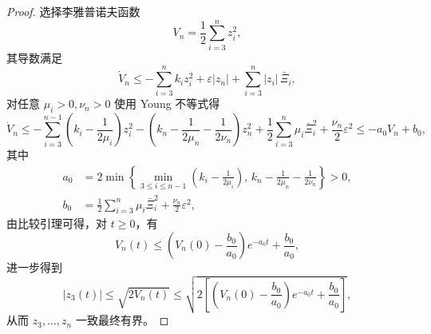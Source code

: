 \begin{proof}
选择李雅普诺夫函数
\begin{equation}\label{eq:ch3_vn_mid}
V_n=\frac{1}{2}\sum_{i=3}^{n}z_i^2,
\end{equation}
其导数满足
\begin{equation}\label{eq:ch3_vdot_mid}
\dot V_n
\le -\sum_{i=3}^{n}k_i z_i^2+\varepsilon|z_n|+\sum_{i=3}^{n}|z_i|\,\bar\Xi_i,
\end{equation}
对任意 $\mu_i>0,\nu_n>0$ 使用 Young 不等式得
\begin{equation}\label{eq:ch3_vdot_mid2}
\dot V_n
\le -\sum_{i=3}^{n-1}\left(k_i-\frac{1}{2\mu_i}\right)z_i^2
 -\left(k_n-\frac{1}{2\mu_n}-\frac{1}{2\nu_n}\right)z_n^2
 +\frac{1}{2}\sum_{i=3}^{n}\mu_i\bar\Xi_i^2+\frac{\nu_n}{2}\varepsilon^2
\le -a_0V_n+b_0,
\end{equation}
其中
\begin{subequations}
\begin{align}
a_0&=2\min\left\{\min_{3\le i\le n-1}\left(k_i-\frac{1}{2\mu_i}\right),\,k_n-\frac{1}{2\mu_n}-\frac{1}{2\nu_n}\right\}>0,\\
b_0&=\frac{1}{2}\sum_{i=3}^{n}\mu_i\bar\Xi_i^2+\frac{\nu_n}{2}\varepsilon^2,
\end{align}
\end{subequations}
由比较引理可得，对 $t\ge 0$，有
\begin{equation}\label{eq:ch3_vn_bound_mid}
V_n(t)\le \left(V_n(0)-\frac{b_0}{a_0}\right)e^{-a_0t}+\frac{b_0}{a_0},
\end{equation}
进一步得到
\begin{equation}\label{eq:ch3_s_bound_mid}
|z_3(t)|\le \sqrt{2V_n(t)}
\le \sqrt{2\left[\left(V_n(0)-\frac{b_0}{a_0}\right)e^{-a_0t}+\frac{b_0}{a_0}\right]},
\end{equation}
从而 $z_3,\ldots,z_n$ 一致最终有界。


\end{proof}
